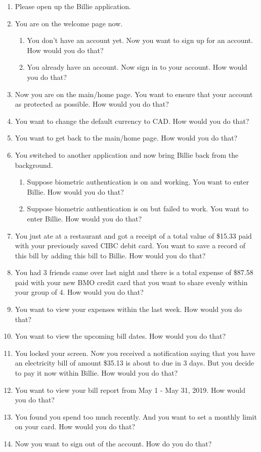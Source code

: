 \documentclass{sigchi}
\begin{document}
\begin{enumerate}
\item Please open up the Billie application.
\item You are on the welcome page now. 
    \begin{enumerate}
        \item You don't have an account yet. Now you want to sign up for an account. How would you do that?
        \item You already have an account. Now sign in to your account. How would you do that?
    \end{enumerate}
\item Now you are on the main/home page. You want to ensure that your account as protected as possible. How would you do that?
\item You want to change the default currency to CAD. How would you do that?
\item You want to get back to the main/home page. How would you do that?
\item You switched to another application and now bring Billie back from the background.
    \begin{enumerate}
    \item Suppose biometric authentication is on and working. You want to enter Billie. How would you do that?
    \item Suppose biometric authentication is on but failed to work. You want to enter Billie. How would you do that?
    \end{enumerate}
\item You just ate at a restaurant and got a receipt of a total value of \$15.33 paid with your previously saved CIBC debit card. You want to save a record of this bill by adding this bill to Billie. How would you do that?
\item You had 3 friends came over last night and there is a total expense of \$87.58 paid with your new BMO credit card that you want to share evenly within your group of 4. How would you do that?
\item You want to view your expenses within the last week. How would you do that?
\item You want to view the upcoming bill dates. How would you do that?
\item You locked your screen. Now you received a notification saying that you have an electricity bill of amount \$35.13 is about to due in 3 days. But you decide to pay it now within Billie. How would you do that?
\item You want to view your bill report from May 1 - May 31, 2019. How would you do that?
\item You found you spend too much recently. And you want to set a monthly limit on your card. How would you do that?
\item Now you want to sign out of the account. How do you do that?
\end{enumerate}
\end{document}
